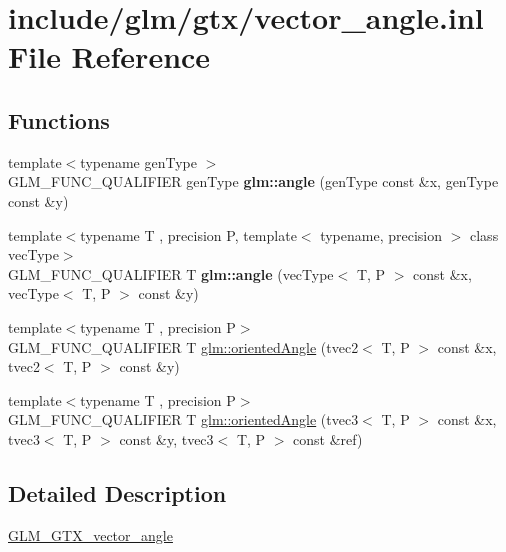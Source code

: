 \hypertarget{vector__angle_8inl}{}\section{include/glm/gtx/vector\+\_\+angle.inl File Reference}
\label{vector__angle_8inl}
\subsection*{Functions}
\begin{DoxyCompactItemize}
\item 
\mbox{\label{vector__angle_8inl_a0634619b62db66fe6a4bd04da1feabea}} 
{\footnotesize template$<$typename gen\+Type $>$ }\\G\+L\+M\+\_\+\+F\+U\+N\+C\+\_\+\+Q\+U\+A\+L\+I\+F\+I\+ER gen\+Type {\bfseries glm\+::angle} (gen\+Type const \&x, gen\+Type const \&y)
\item 
\mbox{\label{vector__angle_8inl_a8501bc310fa98bb40bec1b3c285183f1}} 
{\footnotesize template$<$typename T , precision P, template$<$ typename, precision $>$ class vec\+Type$>$ }\\G\+L\+M\+\_\+\+F\+U\+N\+C\+\_\+\+Q\+U\+A\+L\+I\+F\+I\+ER T {\bfseries glm\+::angle} (vec\+Type$<$ T, P $>$ const \&x, vec\+Type$<$ T, P $>$ const \&y)
\item 
{\footnotesize template$<$typename T , precision P$>$ }\\G\+L\+M\+\_\+\+F\+U\+N\+C\+\_\+\+Q\+U\+A\+L\+I\+F\+I\+ER T \hyperlink{group__gtx__vector__angle_ga82a19d474be13c92c7b10caab42a5a72}{glm\+::oriented\+Angle} (tvec2$<$ T, P $>$ const \&x, tvec2$<$ T, P $>$ const \&y)
\item 
{\footnotesize template$<$typename T , precision P$>$ }\\G\+L\+M\+\_\+\+F\+U\+N\+C\+\_\+\+Q\+U\+A\+L\+I\+F\+I\+ER T \hyperlink{group__gtx__vector__angle_ga7254dba112eff55f55f9544f41cb9ece}{glm\+::oriented\+Angle} (tvec3$<$ T, P $>$ const \&x, tvec3$<$ T, P $>$ const \&y, tvec3$<$ T, P $>$ const \&ref)
\end{DoxyCompactItemize}


\subsection{Detailed Description}
\hyperlink{group__gtx__vector__angle}{G\+L\+M\+\_\+\+G\+T\+X\+\_\+vector\+\_\+angle} 
